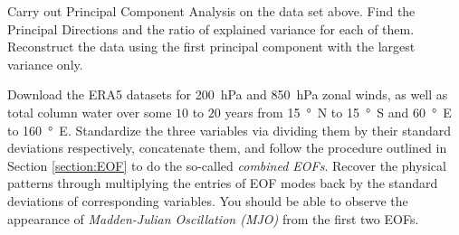 \begin{Exercise}
Carry out Principal Component Analysis on the data set above. Find the Principal Directions and the ratio of explained variance for each of them. Reconstruct the data using the first principal component with the largest variance only.
\end{Exercise}

\begin{Exercise}
\label{ex:MJO}
Download the ERA5 datasets for \SI{200}{hPa} and \SI{850}{hPa} zonal winds, as well as total column water over some $10$ to $20$ years from \SI{15}{\degree N} to \SI{15}{\degree S} and \SI{60}{\degree E} to \SI{160}{\degree E}. Standardize the three variables via dividing them by their standard deviations respectively, concatenate them, and follow the procedure outlined in Section \ref{section:EOF} to do the so-called \textit{combined EOFs}. Recover the physical patterns through multiplying the entries of EOF modes back by the standard deviations of corresponding variables. You should be able to observe the appearance of \textit{Madden-Julian Oscillation (MJO)} from the first two EOFs. 
\end{Exercise}

